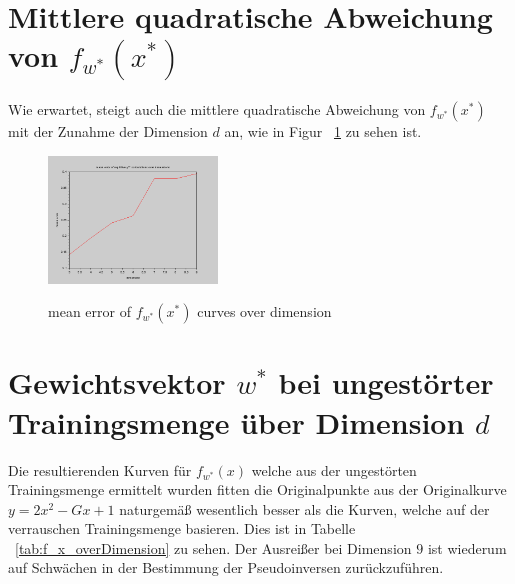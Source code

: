 \documentclass[]{report}
\begin{document}
\section{Mittlere quadratische Abweichung von $f_{w^*}(x^*)$}

Wie erwartet, steigt auch die mittlere quadratische Abweichung von $f_{w^*}(x^*)$ mit der Zunahme der Dimension $d$ an, wie in Figur ~\ref{fig:MeanError} zu sehen ist.

\begin{figure}[h]
\centering
\includegraphics[width=0.4\textwidth]{./images/MeanErrorOverDimensions.png} \\
\caption{mean error of $f_{w^*}(x^*)$ curves over dimension}
\label{fig:MeanError}
\end{figure}

\section{Gewichtsvektor $w^*$ bei ungest\"orter Trainingsmenge \"uber Dimension $d$}

Die resultierenden Kurven f\"ur $f_{w^*}(x)$ welche aus der ungest\"orten Trainingsmenge ermittelt wurden fitten die Originalpunkte aus der Originalkurve $y = 2x^2-Gx+1$ naturgem\"a{\ss} wesentlich besser als die Kurven, welche auf der verrauschen Trainingsmenge basieren. Dies ist in Tabelle ~\ref{tab:f_x_overDimension} zu sehen. Der Ausrei{\ss}er bei Dimension $9$ ist wiederum auf Schw\"achen in der Bestimmung der Pseudoinversen zur\"uckzuf\"uhren.
\end{document}
